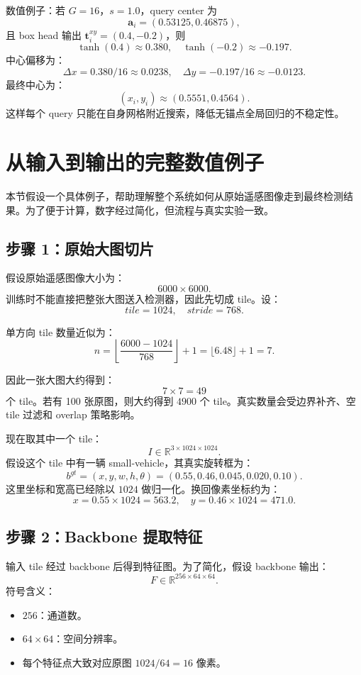 \documentclass[11pt,a4paper]{ctexart}
\begin{document}
数值例子：若 $G=16$，$s=1.0$，query center 为
\[
\bm a_i=(0.53125,0.46875),
\]
且 box head 输出 $\bm t_i^{xy}=(0.4,-0.2)$，则
\[
\tanh(0.4)\approx0.380,\quad \tanh(-0.2)\approx-0.197.
\]
中心偏移为：
\[
\Delta x=0.380/16\approx0.0238,\quad
\Delta y=-0.197/16\approx-0.0123.
\]
最终中心为：
\[
(x_i,y_i)\approx(0.5551,0.4564).
\]
这样每个 query 只能在自身网格附近搜索，降低无锚点全局回归的不稳定性。

\section{从输入到输出的完整数值例子}

本节假设一个具体例子，帮助理解整个系统如何从原始遥感图像走到最终检测结果。为了便于计算，数字经过简化，但流程与真实实验一致。

\subsection{步骤 1：原始大图切片}

假设原始遥感图像大小为：
\[
6000\times6000.
\]
训练时不能直接把整张大图送入检测器，因此先切成 tile。设：
\[
tile=1024,\quad stride=768.
\]

单方向 tile 数量近似为：
\[
n=\left\lfloor\frac{6000-1024}{768}\right\rfloor+1
=\lfloor6.48\rfloor+1=7.
\]

因此一张大图大约得到：
\[
7\times7=49
\]
个 tile。若有 100 张原图，则大约得到 $4900$ 个 tile。真实数量会受边界补齐、空 tile 过滤和 overlap 策略影响。

现在取其中一个 tile：
\[
I\in\mathbb{R}^{3\times1024\times1024}.
\]
假设这个 tile 中有一辆 small-vehicle，其真实旋转框为：
\[
b^{gt}=(x,y,w,h,\theta)=(0.55,0.46,0.045,0.020,0.10).
\]
这里坐标和宽高已经除以 $1024$ 做归一化。换回像素坐标约为：
\[
x=0.55\times1024=563.2,\quad
y=0.46\times1024=471.0.
\]

\subsection{步骤 2：Backbone 提取特征}

输入 tile 经过 backbone 后得到特征图。为了简化，假设 backbone 输出：
\[
F\in\mathbb{R}^{256\times64\times64}.
\]
符号含义：
\begin{itemize}
  \item $256$：通道数。
  \item $64\times64$：空间分辨率。
  \item 每个特征点大致对应原图 $1024/64=16$ 像素。
\end{itemize}
\end{document}
